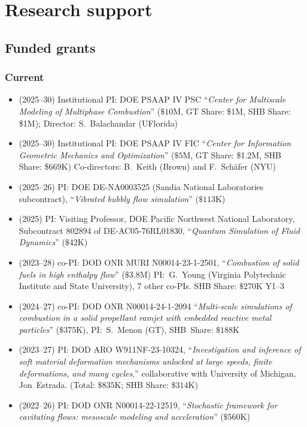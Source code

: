 \section{Research support}

% 

\subsection{Funded grants}

\subsubsection{Current}

\begin{itemize}
    \item (2025--30) Institutional PI: DOE PSAAP IV PSC ``\textit{Center for Multiscale Modeling of Multiphase Combustion}'' ($\$10$M, GT Share: \$1M, SHB Share: \$1M); Director: S.~Balachandar (UFlorida)
    \item (2025--30) Institutional PI: DOE PSAAP IV FIC ``\textit{Center for Information Geometric Mechanics and Optimization}'' ($\$5$M, GT Share: \$1.2M, SHB Share: \$669K) Co-directors: B.~Keith (Brown) and F.~Sch\"afer (NYU)
    \item (2025--26) PI: DOE DE-NA0003525 (Sandia National Laboratories subcontract), ``\textit{Vibrated bubbly flow simulation}'' ($\$113$K)
    \item (2025) PI: Visiting Professor, DOE Pacific Northwest National Laboratory, Subcontract 802894 of DE-AC05-76RL01830, ``\textit{Quantum Simulation of Fluid Dynamics}'' ($\$42$K)
    \item (2023--28) co-PI: DOD ONR MURI N00014-23-1-2501, ``\textit{Combustion of solid fuels in high enthalpy flow}'' ($\$3.8$M) PI:~G.~Young (Virginia Polytechnic Institute and State University), 7 other co-PIs. SHB Share: $\$270$K Y1--3
    \item (2024--27) co-PI: DOD ONR N00014-24-1-2094 ``\textit{Multi-scale simulations of combustion in a solid propellant ramjet with embedded reactive metal particles}'' ($\$375$K), PI:~S.~Menon (GT), SHB~Share: $\$188$K 
    \item (2023--27) PI: DOD ARO W911NF-23-10324, ``\textit{Investigation and inference of soft material deformation mechanisms unlocked at large speeds, finite deformations, and many cycles},'' collaborative with University of Michigan, Jon~Estrada. (Total: $\$835$K; SHB Share: $\$314$K)
    \item (2022--26) PI: DOD ONR N00014-22-12519, ``\textit{Stochastic framework for cavitating flows: mesoscale modeling and acceleration}'' ($\$560$K)
\end{itemize}

